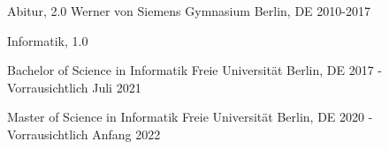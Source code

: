 
\begin{cventries}
\cventry
    {Abitur, 2.0} 
    {Werner von Siemens Gymnasium} %
    {Berlin, DE} %
    {2010-2017} %
    {
        \begin{cvitems}
        \item {Informatik, 1.0}
        \end{cvitems}
    }
    
  \cventry
    {Bachelor of Science in Informatik} 
    {Freie Universität} %
    {Berlin, DE} %
    {2017 - Vorrausichtlich Juli 2021} %
    {
        \begin{cvitems}
        \end{cvitems}
    }
    
  \cventry
    {Master of Science in Informatik} 
    {Freie Universität} %
    {Berlin, DE} %
    {2020 - Vorrausichtlich Anfang 2022} %
    {
        \begin{cvitems}
        \end{cvitems}
    }
\end{cventries}
